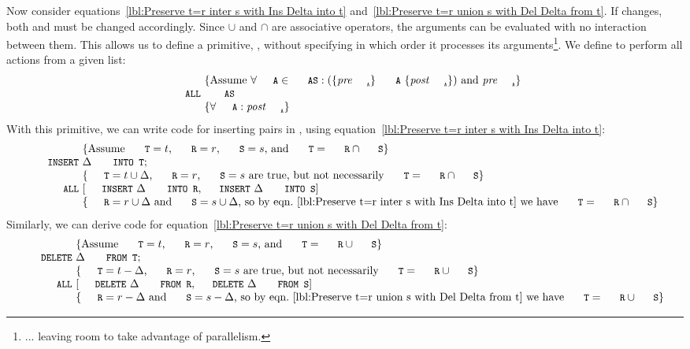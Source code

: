 \documentclass{svproc}
\begin{document}
	Now consider equations~\ref{lbl:Preserve t=r inter s with Ins Delta into t} and~\ref{lbl:Preserve t=r union s with Del Delta from t}.
	If  changes, both  and  must be changed accordingly.
	Since $\cup$ and $\cap$ are associative operators, the arguments can be evaluated with no interaction between them.
	This allows us to define a primitive, , without specifying in which order it processes its arguments\footnote{... leaving room to take advantage of parallelism.}.
	We define  to perform all actions from a given list:
\[\begin{array}{r@{~}l}
&\{\text{Assume }\forall\code{A}\in\code{AS}: (\{\id{pre}_{\code{\tiny A}}\}\ \code{A}\ \{\id{post}_{\code{\tiny A}}\})\text{ and } \id{pre}_{\code{\tiny A}} \}\\
\code{ALL}&\ \code{AS}\\
&\{\forall\code{A}: \id{post}_{\code{\tiny A}}\}
\end{array}\]
	With this primitive, we can write code for inserting pairs in ,
	using equation~\ref{lbl:Preserve t=r inter s with Ins Delta into t}:
\[\begin{array}{r@{~}l}
&\{\text{Assume $\code{T}=t$, $\code{R}=r$, $\code{S}=s$, and $\code{T}=\code{R}\cap\code{S}$}\}\\
\code{INSERT}&\Delta\code{ INTO T};\\
&\{\text{$\code{T}=t\cup\Delta$, $\code{R}=r$, $\code{S}=s$ are true, but not necessarily $\code{T}=\code{R}\cap\code{S}$}\}\\
\code{ALL}&[\code{INSERT}\ \Delta\code{ INTO R},\code{INSERT}\ \Delta\code{ INTO S}]\\
&\{\code{R}=r\cup\Delta\text{ and }\code{S}=s\cup\Delta\text{, so by eqn.~\ref{lbl:Preserve t=r inter s with Ins Delta into t} we have }\code{T}=\code{R}\cap\code{S}\}
\end{array}\]
	Similarly, we can derive code for equation~\ref{lbl:Preserve t=r union s with Del Delta from t}:
\[\begin{array}{r@{~}l}
&\{\text{Assume $\code{T}=t$, $\code{R}=r$, $\code{S}=s$, and $\code{T}=\code{R}\cup\code{S}$}\}\\
\code{DELETE}&\Delta\code{ FROM T};\\
&\{\text{$\code{T}=t-\Delta$, $\code{R}=r$, $\code{S}=s$ are true, but not necessarily $\code{T}=\code{R}\cup\code{S}$}\}\\
\code{ALL}&[\code{DELETE}\ \Delta\code{ FROM R},\code{DELETE}\ \Delta\code{ FROM S}]\\
&\{\code{R}=r-\Delta\text{ and }\code{S}=s-\Delta\text{, so by eqn.~\ref{lbl:Preserve t=r union s with Del Delta from t} we have }\code{T}=\code{R}\cup\code{S}\}
\end{array}\]
\end{document}
